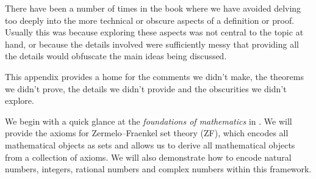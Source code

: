 There have been a number of times in the book where we have avoided delving too deeply into the more technical or obscure aspects of a definition or proof. Usually this was because exploring these aspects was not central to the topic at hand, or because the details involved were sufficiently messy that providing all the details would obfuscate the main ideas being discussed.

This appendix provides a home for the comments we didn't make, the theorems we didn't prove, the details we didn't provide and the obscurities we didn't explore.

We begin with a quick glance at the \textit{foundations of mathematics} in . We will provide the axioms for Zermelo--Fraenkel set theory (ZF), which encodes all mathematical objects as sets and allows us to derive all mathematical objects from a collection of axioms. We will also demonstrate how to encode natural numbers, integers, rational numbers and complex numbers within this framework.